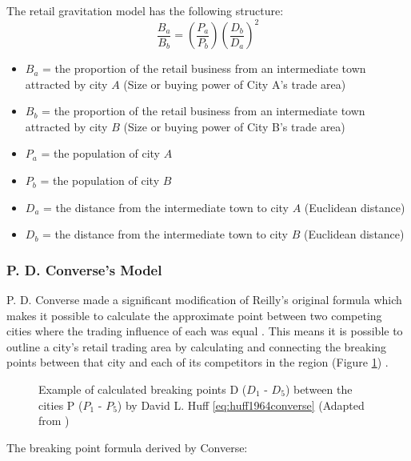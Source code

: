 The retail gravitation model has the following structure:
\begin{equation}
\frac{B_a}{B_b}= \left( \frac{P_a}{P_b} \right) \left( \frac{D_b}{D_a} \right)^2
\label{WilliamEquation}
\end{equation}

\begin{itemize}
    \item{$B_a$ = the proportion of the retail business from an intermediate town attracted by city $A$ (Size or buying power of City A's trade area)}
    \item{$B_b$ = the proportion of the retail business from an intermediate town attracted by city $B$ (Size or buying power of City B's trade area)}
    \item{$P_a$ = the population of city $A$}
    \item{$P_b$ = the population of city $B$}
    \item{$D_a$ = the distance from the intermediate town to city $A$ (Euclidean distance)}
    \item{$D_b$ = the distance from the intermediate town to city $B$ (Euclidean distance)}
\end{itemize}

\subsubsection{P. D. Converse's Model}
\label{label:converse}

P. D. Converse made a significant modification of Reilly's original formula which makes it possible to calculate the approximate point between two competing cities where the trading influence of each was equal \cite{huff1964defining}. This means it is possible to outline a city's retail trading area by calculating and connecting the breaking points between that city and each of its competitors in the region (Figure \ref{fig:converse1931model}) \cite{huff1964defining}.

\begin{figure}[ht]
	\centering
	
	\caption{Example of calculated breaking points D ($D_1$ - $D_5$) between the cities P ($P_1$ - $P_5$) by David L. Huff \ref{eq:huff1964converse} (Adapted from \cite{huff1964defining})}
	\label{fig:converse1931model}
\end{figure}

The breaking point formula derived by Converse:

